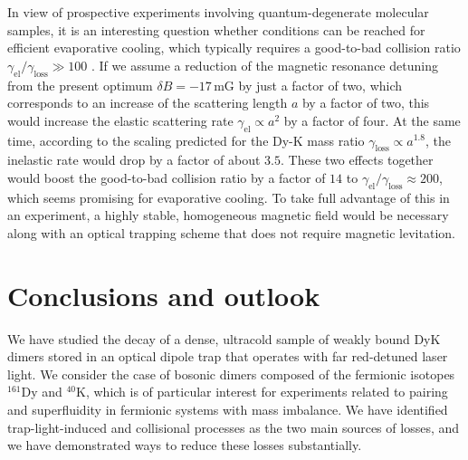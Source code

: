 In view of prospective experiments involving quantum-degenerate molecular samples, it is an interesting question whether conditions can be reached for efficient evaporative cooling, which typically requires a good-to-bad collision ratio $\gamma_{\mathrm{el}}/\gamma_{\mathrm{loss}} \gg 100$  \cite{Ketterle1996eco}. If we assume a reduction of the magnetic resonance detuning from the present optimum $\delta B = -17\,$mG by just a factor of two, which corresponds to an increase of the scattering length $a$ by a factor of two, this would increase the elastic scattering rate $\gamma_{\mathrm{el}} \propto a^2$ by a factor of four. At the same time, according to the scaling predicted for the Dy-K mass ratio \cite{Petrov2005dmi} $\gamma_{\mathrm{loss}} \propto a^{1.8}$, the inelastic rate would drop by a factor of about $3.5$. These two effects together would boost the good-to-bad collision ratio by a factor of $14$ to $\gamma_{\mathrm{el}}/\gamma_{\mathrm{loss}} \approx 200$, which seems promising for evaporative cooling. To take full advantage of this in an experiment, a highly stable, homogeneous magnetic field would be necessary along with an optical trapping scheme that does not require magnetic levitation.


\section{Conclusions and outlook}
\label{Sec:Conclusions}

We have studied the decay of a dense, ultracold sample of weakly bound DyK dimers stored in an optical dipole trap that operates with far red-detuned laser light. We consider the case of bosonic dimers composed of the fermionic isotopes $^{161}$Dy and $^{40}$K, which is of particular interest for experiments related to pairing and superfluidity in fermionic systems with mass imbalance. We have identified trap-light-induced and collisional processes as the two main sources of losses, and we have demonstrated ways to reduce these losses substantially.

